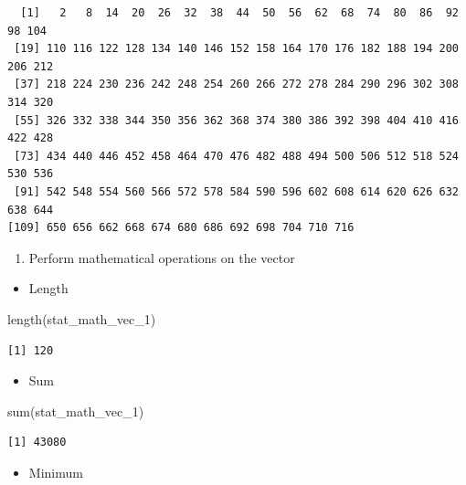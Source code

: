 \documentclass[
  letterpaper,
  DIV=11,
  numbers=noendperiod]{scrreprt}
\newenvironment{Shaded}{\begin{snugshade}}{\end{snugshade}}
\newcommand{\FunctionTok}[1]{\textcolor[rgb]{0.28,0.35,0.67}{#1}}
\newcommand{\NormalTok}[1]{\textcolor[rgb]{0.00,0.23,0.31}{#1}}
\providecommand{\tightlist}{%
  \setlength{\itemsep}{0pt}\setlength{\parskip}{0pt}}\usepackage{longtable,booktabs,array}
\begin{document}
\begin{verbatim}
  [1]   2   8  14  20  26  32  38  44  50  56  62  68  74  80  86  92  98 104
 [19] 110 116 122 128 134 140 146 152 158 164 170 176 182 188 194 200 206 212
 [37] 218 224 230 236 242 248 254 260 266 272 278 284 290 296 302 308 314 320
 [55] 326 332 338 344 350 356 362 368 374 380 386 392 398 404 410 416 422 428
 [73] 434 440 446 452 458 464 470 476 482 488 494 500 506 512 518 524 530 536
 [91] 542 548 554 560 566 572 578 584 590 596 602 608 614 620 626 632 638 644
[109] 650 656 662 668 674 680 686 692 698 704 710 716
\end{verbatim}

\begin{enumerate}
\def\labelenumi{\alph{enumi}.}
\setcounter{enumi}{1}
\tightlist
\item
  Perform mathematical operations on the vector
\end{enumerate}

\begin{itemize}
\tightlist
\item
  Length
\end{itemize}

\begin{Shaded}
\begin{Highlighting}[]
\FunctionTok{length}\NormalTok{(stat\_math\_vec\_1)}
\end{Highlighting}
\end{Shaded}

\begin{verbatim}
[1] 120
\end{verbatim}

\begin{itemize}
\tightlist
\item
  Sum
\end{itemize}

\begin{Shaded}
\begin{Highlighting}[]
\FunctionTok{sum}\NormalTok{(stat\_math\_vec\_1)}
\end{Highlighting}
\end{Shaded}

\begin{verbatim}
[1] 43080
\end{verbatim}

\begin{itemize}
\tightlist
\item
  Minimum
\end{itemize}
\end{document}
